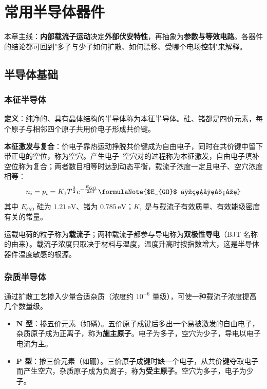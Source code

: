\chapter{常用半导体器件}

本章主线：\textbf{内部载流子运动}决定\textbf{外部伏安特性}，再抽象为\textbf{参数与等效电路}。各器件的结论都可回到"多子与少子如何扩散、如何漂移、受哪个电场控制"来解释。

\section{半导体基础}

\subsection{本征半导体}

\textbf{定义}：纯净的、具有晶体结构的半导体称为本征半导体。硅、锗都是四价元素，每个原子与相邻四个原子共用价电子形成共价键。

\textbf{本征激发与复合}：价电子靠热运动挣脱共价键成为自由电子，同时在共价键中留下带正电的空位，称为空穴。产生电子--空穴对的过程称为本征激发，自由电子填补空位称为复合；两者数目相等时达到动态平衡，载流子浓度一定且电子、空穴浓度相等：
\begin{equation}
n_i = p_i = K_1 T^{\frac{3}{2}} e^{-\frac{E_{GO}}{2kT}}
\formulaNote{$E_{GO}$ 为禁带宽度}
\end{equation}
其中 $E_{GO}$ 硅为 $1.21\,\text{eV}$、锗为 $0.785\,\text{eV}$；$K_1$ 是与载流子有效质量、有效能级密度有关的常量。

运载电荷的粒子称为\textbf{载流子}；两种载流子都参与导电称为\textbf{双极性导电}（BJT 名称的由来）。载流子浓度只取决于材料与温度，温度升高时按指数增大，这是半导体器件温度敏感的根源。

\subsection{杂质半导体}

通过扩散工艺掺入少量合适杂质（浓度约 $10^{-6}$ 量级），可使一种载流子浓度提高几个数量级。
\begin{itemize}
    \item \textbf{N 型}：掺五价元素（如磷）。五价原子成键后多出一个易被激发的自由电子，杂质原子成为正离子，称为\textbf{施主原子}。电子为多子，空穴为少子，导电以电子电流为主。
    \item \textbf{P 型}：掺三价元素（如硼）。三价原子成键时缺一个电子，从共价键夺取电子而产生空穴，杂质原子成为负离子，称为\textbf{受主原子}。空穴为多子，电子为少子。
\end{itemize}

